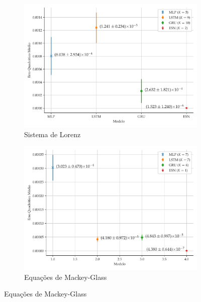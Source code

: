 \documentclass[aspectratio=169]{beamer}
\begin{document}
\begin{frame}
\begin{figure}[!h]
     \centering\\
     \begin{subfigure}[t]{0.4\textwidth}
     \centering
         \includegraphics[scale=0.15]{comparacao-k-lorenz.pdf}
         \caption{Sistema de Lorenz}
     \end{subfigure}
     \centering
     \begin{subfigure}[t]{0.4\textwidth} 
     \centering
         \includegraphics[scale=0.15]{comparacao-k-mackeyglass.pdf}
         \caption{Equações de Mackey-Glass}
     \end{subfigure}  
     \centering   
     \label{fig:model-comparison}
\end{figure}
\end{frame}
\end{document}
